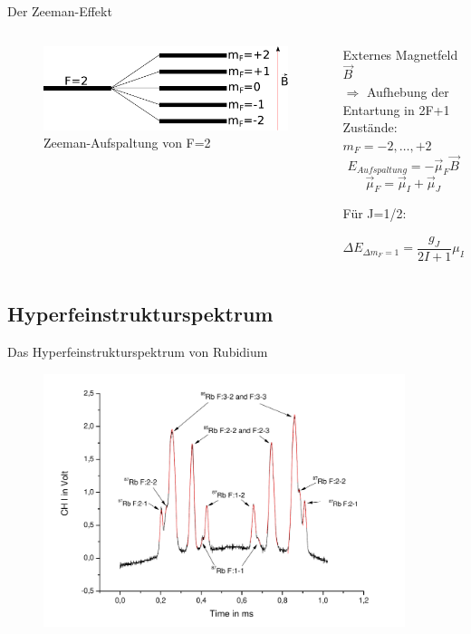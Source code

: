 \documentclass{beamer}
\begin{document}
\begin{frame}{Der Zeeman-Effekt}
\begin{columns}
\begin{column}{4.5cm}
	\begin{figure}[H]
	\centering \includegraphics[width=\textwidth]{Bilder/zeeman.pdf}
	\caption{Zeeman-Aufspaltung von F=2}
	\end{figure}
\end{column}
\begin{column}{5.5cm}
Externes Magnetfeld $\vec B$ \\ $\Rightarrow$ Aufhebung der Entartung in 2F+1 Zustände: $m_F = -2,\dots,+2$
$$E_{Aufspaltung} = - \vec\mu_F\vec B$$ 
$$\vec\mu_F = \vec\mu_I + \vec \mu_J$$

Für J=1/2:

$$\Delta E_{\Delta m_F=1} = \frac{g_J}{2I+1}\mu_B B$$
\end{column}
\end{columns}
\end{frame}


\subsection{Hyperfeinstrukturspektrum}
\begin{frame}{Das Hyperfeinstrukturspektrum von Rubidium}
	\begin{figure}[H]
	\centering \includegraphics[width=0.94\textwidth]{Bilder/HFS.pdf}
	\end{figure}
\end{frame}
\end{document}
